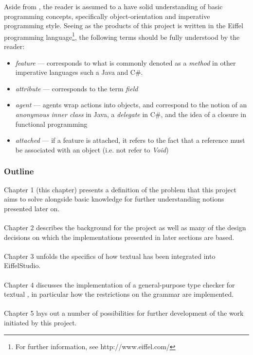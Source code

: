 Aside from \bon{}, the reader is assumed to a have solid understanding of basic programming concepts, specifically object-orientation and imperative programming style. Seeing as the products of this project is written in the Eiffel programming language\footnote{For further information, see http://www.eiffel.com/}, the following terms should be fully understood by the reader:
\begin{itemize}
\item \textit{feature} --- corresponds to what is commonly denoted as a \textit{method} in other imperative languages such a Java and C\#.
\item \textit{attribute} --- corresponds to the term \textit{field}
\item \textit{agent} --- agents wrap actions into objects, and correspond to the notion of an \textit{anonymous inner class} in Java, a \textit{delegate} in C\#, and the idea of a closure in functional programming
\item \textit{attached} --- if a feature is attached, it refers to the fact that a reference must be associated with an object (i.e. not refer to \textit{Void})
\end{itemize} 

\subsubsection{Outline}
Chapter 1 (this chapter) presents a definition of the problem that this project aims to solve alongside basic knowledge for further understanding notions presented later on.
\paragraph{}
Chapter 2 describes the background for the project as well as many of the design decisions on which the implementations presented in later sections are based.
\paragraph{}
Chapter 3 unfolds the specifics of how textual \bon{} has been integrated into EiffelStudio.
\paragraph{}
Chapter 4 discusses the implementation of a general-purpose type checker for textual \bon{}, in particular how the restrictions on the grammar are implemented.
\paragraph{}
Chapter 5 lays out a number of possibilities for further development of the work initiated by this project.

